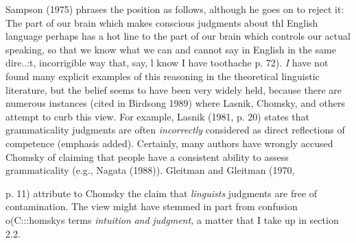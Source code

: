 \begin{listWWNumlxixleveli}
\item 
\begin{styleStandard}
Sampson (1975) phrases the position as follows, although he goes on to reject it: {\textquotedbl}The part of our brain which makes conscious judgments about thl{\textquotedbl} English language perhaps has a {\textquotesingle}hot line{\textquotesingle} to the part of our brain which controls our actual speaking, so that we know what we can and cannot say in English in the same dire..:t, {\textquotesingle}incorrigible{\textquotesingle} way that, say, l know I have toothache{\textquotedbl} p. 72). \textit{I}\textit{ }have not found many explicit examples of this reasoning in the theoretical linguistic literature, but the belief seems to have been very widely held, because there are numerous instances (cited in Birdsong 1989) where Lasnik, Chomsky, and others attempt to curb this view. For example, Lasnik (1981, p. 20) states that {\textquotedbl}grammaticality judgments are often \textit{incorrectly}\textit{ }considered as direct reflections of competence{\textquotedbl} (emphasis added). Certainly, many authors have wrongly accused Chomsky of claiming that people have a consistent ability to assess grammaticality (e.g., Nagata (1988)). Gleitman and Gleitman (1970,
\end{styleStandard}


\end{listWWNumlxixleveli}
\begin{styleStandard}
p. 11) attribute to Chomsky the claim that \textit{linguists{\textquotesingle}}\textit{ }judgments are free of contamination. The view might have stemmed in part from confusion o(C:::homsky{\textquotesingle}s terms \textit{intuition}\textit{ }\textit{and}\textit{ }\textit{judgment,}\textit{ }a matter that I take up in section 2.2.
\end{styleStandard}


